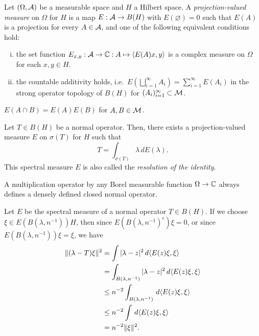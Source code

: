 \documentclass{../../large}
\begin{document}
\begin{prb}
Let $(\Omega,\mathcal{A})$ be a measurable space and $H$ a Hilbert space.
A \emph{projection-valued measure} on $\Omega$ for $H$ is a map $E:\mathcal{A}\to B(H)$ with $E(\varnothing)=0$ such that $E(A)$ is a projection for every $A\in\mathcal{A}$, and one of the following equivalent conditions hold:
\begin{enumerate}[(i)]
\item the set function $E_{x,y}:\mathcal{A}\to\mathbb{C}:A\mapsto\langle E(A)x,y\rangle$ is a complex measure on $\Omega$ for each $x,y\in H$.
\item the countable additivity holds, i.e.~$E(\bigsqcup_{i=1}^\infty A_i)=\sum_{i=1}^\infty E(A_i)$ in the strong operator topology of $B(H)$ for $(A_i)_{i=1}^\infty\subset\mathcal{M}$.
\end{enumerate}
\begin{parts}
\item $E(A\cap B)=E(A)E(B)$ for $A,B\in\mathcal{M}$.
\end{parts}
\end{prb}

\begin{prb}
Let $T\in B(H)$ be a normal operator.
Then, there exists a projection-valued measure $E$ on $\sigma(T)$ for $H$ such that
\[T=\int_{\sigma(T)}\lambda\,dE(\lambda).\]
This spectral measure $E$ is also called the \emph{resolution of the identity}.
\end{prb}




A multiplication operator by any Borel measurable function $\Omega\to\mathbb{C}$ always defines a densely defined closed normal operator.



Let $E$ be the spectral measure of a normal operator $T\in B(H)$.
If we choose $\xi\in E(B(\lambda,n^{-1}))H$, then since $E(B(\lambda,n^{-1})^c)\xi=0$, or since $E(B(\lambda,n^{-1}))\xi=\xi$, we have
\begin{align*}
\|(\lambda-T)\xi\|^2
&=\int|\lambda-z|^2\,d\langle E(z)\xi,\xi\rangle\\
&=\int_{B(\lambda,n^{-1})}|\lambda-z|^2\,d\langle E(z)\xi,\xi\rangle\\
&\le n^{-2}\int_{B(\lambda,n^{-1})}\,d\langle E(z)\xi,\xi\rangle\\
&\le n^{-2}\int\,d\langle E(z)\xi,\xi\rangle\\
&=n^{-2}\|\xi\|^2.
\end{align*}
\end{document}
